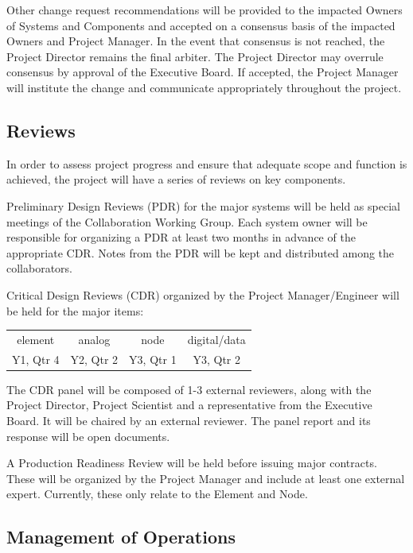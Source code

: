 \documentclass[preprint]{aastex}
\begin{document}
Other change request recommendations will be provided to the impacted Owners of Systems and
Components and accepted on a consensus basis of the impacted Owners and Project Manager.  
In the event that consensus is not reached, the Project Director remains the final arbiter.  The Project 
Director may overrule consensus by approval of the Executive Board.  If accepted, the Project Manager 
will institute the change and communicate appropriately throughout the project.

\subsection{Reviews}
\label{sec:reviews}
In order to assess project progress and ensure that adequate scope and function is achieved,
the project will have a series of reviews on key components.

Preliminary Design Reviews (PDR) for the major systems will be held as special meetings 
of the Collaboration Working Group.  Each system owner will be responsible for organizing
a PDR at least two months in advance of the appropriate CDR.  Notes from the PDR will be
kept and distributed among the collaborators.

Critical Design Reviews (CDR) organized by the Project Manager/Engineer will be 
held for the major items:  
\begin{tabular}{| c{1in} | c{1in} | c{1in} | c{1in} |} \hline
element  & analog & node & digital/data \tabularnewline
 Y1, Qtr 4 &  Y2, Qtr 2 & Y3, Qtr 1 &  Y3, Qtr 2 \tabularnewline \hline
\end{tabular}
\vspace{.1in}

The CDR panel will be composed of 1-3 external reviewers, along with the Project
Director, Project Scientist and a representative
from the Executive Board. It will be chaired by an external reviewer. The panel
report and its response will be open documents.

A Production Readiness Review will be held before issuing major contracts.  These will
be organized by the Project Manager and include at least one external expert.  Currently, these
only relate to the Element and Node.


\subsection{Management of Operations}
\label{sec:operations}
\end{document}
